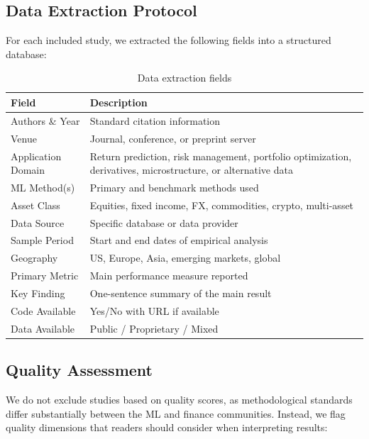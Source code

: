 \subsection{Data Extraction Protocol}

For each included study, we extracted the following fields into a structured database:

\begin{table}[H]
\centering
\caption{Data extraction fields}
\label{tab:extraction}
\begin{tabularx}{\textwidth}{lX}
\toprule
\textbf{Field} & \textbf{Description} \\
\midrule
Authors \& Year & Standard citation information \\
Venue & Journal, conference, or preprint server \\
Application Domain & Return prediction, risk management, portfolio optimization, derivatives, microstructure, or alternative data \\
ML Method(s) & Primary and benchmark methods used \\
Asset Class & Equities, fixed income, FX, commodities, crypto, multi-asset \\
Data Source & Specific database or data provider \\
Sample Period & Start and end dates of empirical analysis \\
Geography & US, Europe, Asia, emerging markets, global \\
Primary Metric & Main performance measure reported \\
Key Finding & One-sentence summary of the main result \\
Code Available & Yes/No with URL if available \\
Data Available & Public / Proprietary / Mixed \\
\bottomrule
\end{tabularx}
\end{table}

\subsection{Quality Assessment}

We do not exclude studies based on quality scores, as methodological standards differ substantially between the ML and finance communities. Instead, we flag quality dimensions that readers should consider when interpreting results:

